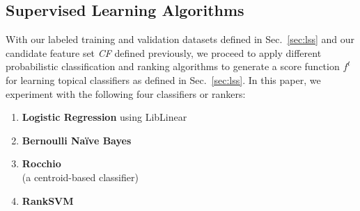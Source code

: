 


\subsection{Supervised Learning Algorithms}

With our labeled training and validation datasets defined in
Sec.~\ref{sec:lss} and our candidate feature set \textit{CF} defined
previously, we proceed to apply different probabilistic classification and ranking
algorithms to generate a score function $f^t$ for learning topical classifiers 
as defined in Sec.~\ref{sec:lss}.  In this paper, we experiment with
the following four classifiers or rankers:%
\begin{enumerate}[noitemsep] %
\item {\bf Logistic Regression} using LibLinear~\cite{liblinear}
\item {\bf Bernoulli Na\"{i}ve Bayes}~\cite{mccallum98nb}
\item {\bf Rocchio}~\cite{manning_ir}\\(a centroid-based classifier)
\item {\bf RankSVM}~\cite{largescale_ranksvm}
\end{enumerate}

